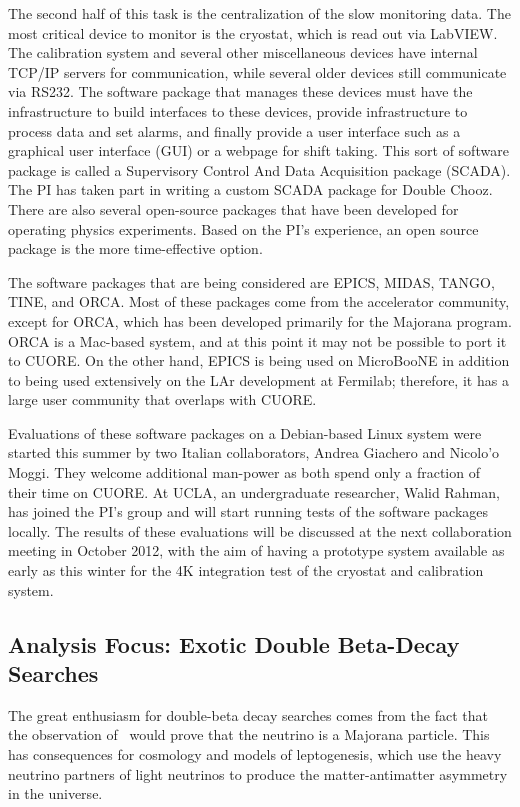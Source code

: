 The second half of this task is the centralization of the slow monitoring data. The most critical device to monitor is the cryostat, which is read out via LabVIEW. The calibration system and several other miscellaneous devices have internal TCP/IP servers for communication, while several older devices still communicate via RS232. The software package that manages these devices must have the infrastructure to build interfaces to these devices, provide infrastructure to process data and set alarms, and finally provide a user interface such as a graphical user interface (GUI) or a webpage for shift taking. This sort of software package is called a Supervisory Control And Data Acquisition package (SCADA). The PI has taken part in writing a custom SCADA package for Double Chooz. There are also several open-source packages that have been developed for operating physics experiments. Based on the PI's experience, an open source package is the more time-effective option.

The software packages that are being considered are EPICS\cite{epics}, MIDAS\cite{midas}, TANGO\cite{tango}, TINE\cite{tine}, and ORCA\cite{orca}.  Most of these packages come from the accelerator community, except for ORCA, which has been developed primarily for the Majorana program. ORCA is a Mac-based system, and at this point it may not be possible to port it to CUORE. On the other hand, EPICS is being used on MicroBooNE in addition to being used extensively on the LAr development at Fermilab; therefore, it has a large user community that overlaps with CUORE.

Evaluations of these software packages on a Debian-based Linux system were started this summer by two Italian collaborators, Andrea Giachero and Nicolo'o Moggi. They welcome additional man-power as both spend only a fraction of their time on CUORE. At UCLA, an undergraduate researcher, Walid Rahman, has joined the PI's group and will start running tests of the software packages locally.  The results of these evaluations will be discussed at the next collaboration meeting in October 2012, with the aim of having a prototype system available as early as this winter for the 4K integration test of the cryostat and calibration system.

\subsection{Analysis Focus: Exotic Double Beta-Decay Searches}
The great enthusiasm for double-beta decay searches comes from the fact that the observation of \zeronu~would prove that the neutrino is a Majorana particle. This has consequences for cosmology and models of leptogenesis, which use the heavy neutrino partners of light neutrinos to produce the matter-antimatter asymmetry in the universe. 

